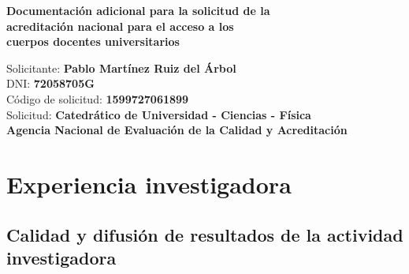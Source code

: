 \documentclass[a4paper, 11pt, twoside, openright]{report}
\begin{document}

\begin{titlepage}

	\vspace*{5.5cm}
	\centering

	{\huge\bfseries Documentación adicional para la solicitud de la \\ \vspace*{1cm}
	                acreditación nacional para el acceso a los\\ \vspace*{1cm}
                        cuerpos docentes universitarios}
	
	\begin{flushleft}
	
	\vspace{6.6cm}
	{\Large Solicitante: \textbf{Pablo Martínez Ruiz del Árbol}\\}
	{\Large DNI: \textbf{72058705G}\\}
	{\Large Código de solicitud: \textbf{1599727061899}\\}
	{\Large Solicitud: \textbf{Catedrático de Universidad - Ciencias - Física}\\}
	{\Large \textbf{Agencia Nacional de Evaluación de la Calidad y Acreditación}}
	\vfill
	
	\end{flushleft}

\end{titlepage}

\tableofcontents
\clearpage
\thispagestyle{empty}
\phantom{a}
\vfill
\newpage


\setcounter{page}{1}

\renewcommand\thechapter{\arabic{chapter}}
\renewcommand\thesection{\thechapter.\Alph{section}}
\renewcommand\thesubsection{\thesection.\arabic{subsection}}
\renewcommand\thesubsubsection{\thesubsection.\arabic{subsubsection}}

\chapter{Experiencia investigadora}

\section{Calidad y difusión de resultados de la actividad investigadora}
\end{document}
